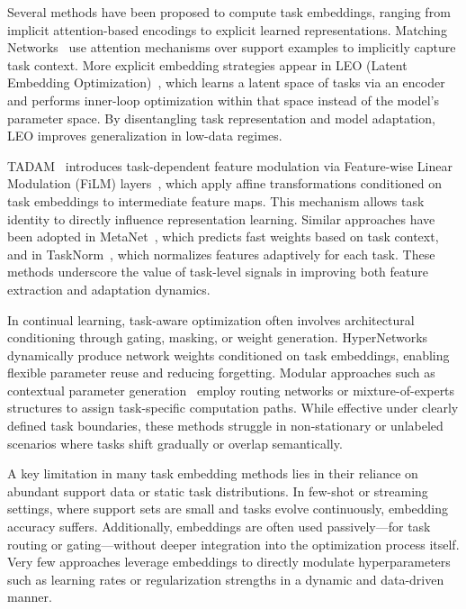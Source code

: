 \documentclass[conference]{IEEEtran}
\begin{document}
Several methods have been proposed to compute task embeddings, ranging from implicit attention-based encodings to explicit learned representations. Matching Networks~\cite{vinyals2016matching} use attention mechanisms over support examples to implicitly capture task context. More explicit embedding strategies appear in LEO (Latent Embedding Optimization)~\cite{rusu2019leo}, which learns a latent space of tasks via an encoder and performs inner-loop optimization within that space instead of the model’s parameter space. By disentangling task representation and model adaptation, LEO improves generalization in low-data regimes.

TADAM~\cite{oreshkin2018tadam} introduces task-dependent feature modulation via Feature-wise Linear Modulation (FiLM) layers~\cite{perez2018film}, which apply affine transformations conditioned on task embeddings to intermediate feature maps. This mechanism allows task identity to directly influence representation learning. Similar approaches have been adopted in MetaNet~\cite{munkhdalai2017meta}, which predicts fast weights based on task context, and in TaskNorm~\cite{bronskill2020tasknorm}, which normalizes features adaptively for each task. These methods underscore the value of task-level signals in improving both feature extraction and adaptation dynamics.

In continual learning, task-aware optimization often involves architectural conditioning through gating, masking, or weight generation. HyperNetworks~\cite{von2019continual, ha2016hypernetworks} dynamically produce network weights conditioned on task embeddings, enabling flexible parameter reuse and reducing forgetting. Modular approaches such as contextual parameter generation~\cite{alet2018modular} employ routing networks or mixture-of-experts structures to assign task-specific computation paths. While effective under clearly defined task boundaries, these methods struggle in non-stationary or unlabeled scenarios where tasks shift gradually or overlap semantically.

A key limitation in many task embedding methods lies in their reliance on abundant support data or static task distributions. In few-shot or streaming settings, where support sets are small and tasks evolve continuously, embedding accuracy suffers. Additionally, embeddings are often used passively—for task routing or gating—without deeper integration into the optimization process itself. Very few approaches leverage embeddings to directly modulate hyperparameters such as learning rates or regularization strengths in a dynamic and data-driven manner.
\end{document}
